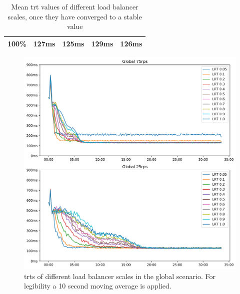 \documentclass[draft,final]{vutinfth} %
\begin{document}
\begin{table}[]
\begin{tabular}{lrrrr}
\textbf{100\%}                                                               & 127ms                                                           & 125ms                                                           & 129ms                                                           & 126ms                                                           \\ \hline
\end{tabular}
\caption{Mean \gls{trt} values of different load balancer scales, once they have converged to a stable value}
\label{tab:lb_scaling_converged_trt}
\end{table}

\begin{figure}
    \centering
    \includegraphics[width=\linewidth]{graphics/graphs/global_lb_scale.png}
    \caption{\glspl{trt} of different load balancer scales in the global scenario. For legibility a 10 second moving average is applied.}
    \label{fig:lb_scale_global}
\end{figure}
\end{document}
